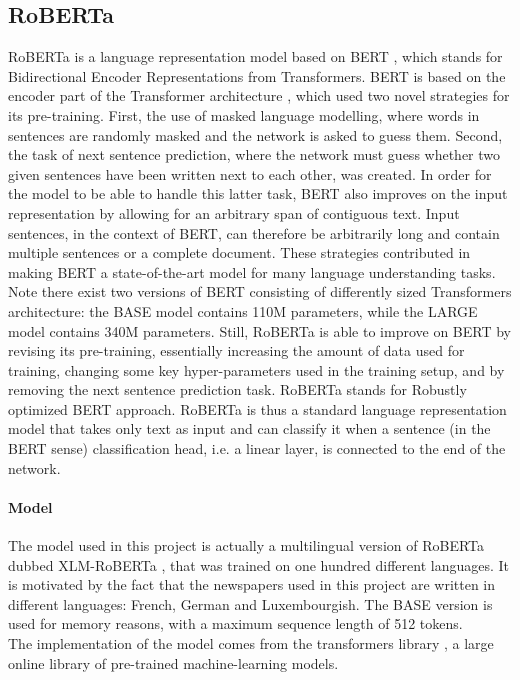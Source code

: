 \subsection{RoBERTa}
RoBERTa \citep{liu_roberta_2019} is a language representation model based on BERT \citep{devlin_bert_2019}, which stands for Bidirectional Encoder Representations from Transformers. BERT is based on the encoder part of the Transformer architecture \citep{vaswani_attention_2017}, which used two novel strategies for its pre-training. First, the use of masked language modelling, where words in sentences are randomly masked and the network is asked to guess them. Second, the task of next sentence prediction, where the network must guess whether two given sentences have been written next to each other, was created. In order for the model to be able to handle this latter task, BERT also improves on the input representation by allowing for an arbitrary span of contiguous text. Input sentences, in the context of BERT, can therefore be arbitrarily long and contain multiple sentences or a complete document. These strategies contributed in making BERT a state-of-the-art model for many language understanding tasks. Note there exist two versions of BERT consisting of differently sized Transformers architecture: the BASE model contains 110M parameters, while the LARGE model contains 340M parameters. Still, RoBERTa is able to improve on BERT by revising its pre-training, essentially increasing the amount of data used for training, changing some key hyper-parameters used in the training setup, and by removing the next sentence prediction task. RoBERTa stands for Robustly optimized BERT approach. RoBERTa is thus a standard language representation model that takes only text as input and can classify it when a sentence (in the BERT sense) classification head, i.e. a linear layer, is connected to the end of the network. 

\paragraph{Model}
The model used in this project is actually a multilingual version of RoBERTa dubbed XLM-RoBERTa \citep{conneau_unsupervised_2020}, that was trained on one hundred different languages. It is motivated by the fact that the newspapers used in this project are written in different languages: French, German and Luxembourgish. The BASE version is used for memory reasons, with a maximum sequence length of 512 tokens.\\
The implementation of the model comes from the transformers library \citep{wolf_huggingfaces_2020}, a large online library of pre-trained machine-learning models. 

